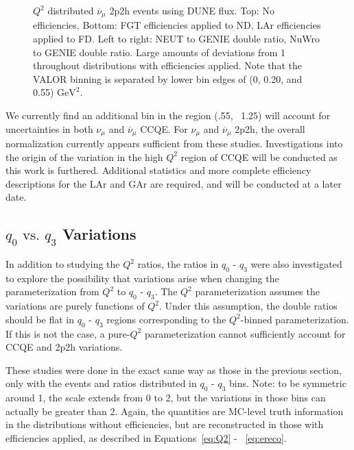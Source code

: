 \documentclass[12pt]{article}
\begin{document}
\begin{figure}[h]
\endminipage
\caption{$Q^2$ distributed $\overline{\nu}_{\mu}$ 2p2h events using DUNE flux. Top: No efficiencies, Bottom: FGT efficiencies applied to ND, LAr efficiencies applied to FD. Left to right: NEUT to GENIE double ratio, NuWro to GENIE double ratio. Large amounts of deviations from 1 throughout distributions with efficiencies applied. Note that the VALOR binning is separated by lower bin edges of (0, 0.20, and 0.55) $\textrm{GeV}^2$.}
\label{fig:Q2_2p2h_numubar_no_eff}
\end{figure}
\FloatBarrier

We currently find an additional bin in the region (.55, ~1.25) will account for uncertainties in both $\nu_{\mu}$ and $\overline{\nu}_{\mu}$ CCQE. For $\nu_{\mu}$ and $\overline{\nu}_{\mu}$ 2p2h, the overall normalization currently appears sufficient from these studies. Investigations into the origin of the variation in the high $Q^2$ region of CCQE will be conducted as this work is furthered. Additional statistics and more complete efficiency descriptions for the LAr and GAr are required, and will be conducted at a later date.

\subsection{$q_0 \textrm{ vs. } q_3$ Variations}
\label{subsec:q0q3}
In addition to studying the $Q^2$ ratios, the ratios in $q_0 \textrm{ - } q_3$ were also investigated to explore the possibility that variations arise when changing the parameterization from $Q^2$ to $q_0 \textrm{ - } q_3$. The $Q^2$ parameterization assumes the variations are purely functions of $Q^2$. Under this assumption, the double ratios should be flat in $q_0 \textrm{ - } q_3$ regions corresponding to the $Q^2$-binned parameterization. If this is not the case, a pure-$Q^2$ parameterization cannot sufficiently account for CCQE and 2p2h variations. 

These studies were done in the exact same way as those in the previous section, only with the events and ratios distributed in $q_0 \textrm{ - } q_3$ bins. Note: to be symmetric around 1, the scale extends from 0 to 2, but the variations in those bins can actually be greater than 2. Again, the quantities are MC-level truth information in the distributions without efficiencies, but are reconstructed in those with efficiencies applied, as described in Equations~\ref{eq:Q2} - ~\ref{eq:ereco}.
\end{document}
